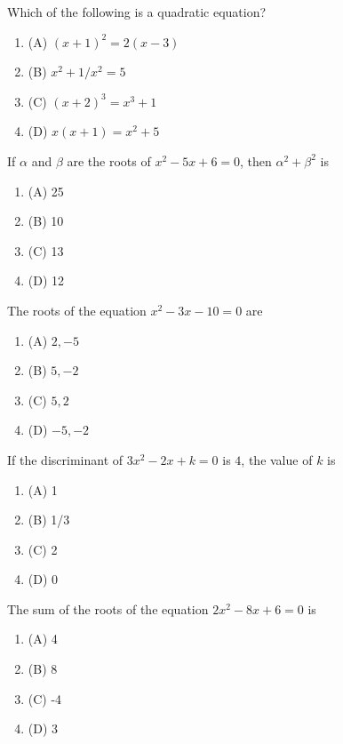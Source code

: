 \documentclass[12pt,a4paper]{exam}
\begin{document}
\begin{questions}
\question[1] Which of the following is a quadratic equation?
\begin{enumerate}[label=(\Alph*)]
  \item (A) $(x+1)^2 = 2(x-3)$
  \item (B) $x^2 + 1/x^2 = 5$
  \item (C) $(x+2)^3 = x^3 + 1$
  \item (D) $x(x+1) = x^2 + 5$
\end{enumerate}
\vspace{0.15cm}

\question[1] If $\alpha$ and $\beta$ are the roots of $x^2 - 5x + 6 = 0$, then $\alpha^2 + \beta^2$ is
\begin{enumerate}[label=(\Alph*)]
  \item (A) 25
  \item (B) 10
  \item (C) 13
  \item (D) 12
\end{enumerate}
\vspace{0.15cm}

\question[1] The roots of the equation $x^2 - 3x - 10 = 0$ are
\begin{enumerate}[label=(\Alph*)]
  \item (A) $2, -5$
  \item (B) $5, -2$
  \item (C) $5, 2$
  \item (D) $-5, -2$
\end{enumerate}
\vspace{0.15cm}

\question[1] If the discriminant of $3x^2 - 2x + k = 0$ is $4$, the value of $k$ is
\begin{enumerate}[label=(\Alph*)]
  \item (A) 1
  \item (B) 1/3
  \item (C) 2
  \item (D) 0
\end{enumerate}
\vspace{0.15cm}

\question[1] The sum of the roots of the equation $2x^2 - 8x + 6 = 0$ is
\begin{enumerate}[label=(\Alph*)]
  \item (A) 4
  \item (B) 8
  \item (C) -4
  \item (D) 3
\end{enumerate}
\vspace{0.15cm}


\end{questions}
\end{document}
